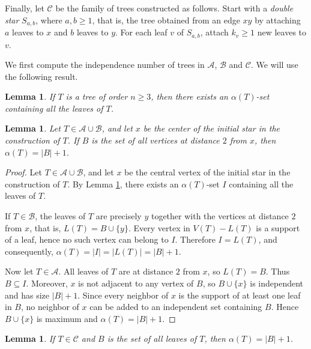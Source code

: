 \documentclass[11pt]{article}
\newtheorem{lemma}[theorem]{Lemma}
\newcommand{\al}{\alpha}
\newcommand{\db}[1]{{\color{orange}#1}}%
\begin{document}
Finally, let $\mathcal{C}$ be the family of trees constructed as follows.
Start with a \emph{double star} $S_{a,b}$, where $a,b\ge 1$, that is,
the tree obtained from an edge $xy$ by attaching $a$ leaves to $x$
and $b$ leaves to $y$.
For each leaf $v$ of $S_{a,b}$, attach $k_v\ge 1$ new leaves to $v$.

We first compute the independence number of trees in $\mathcal{A}$, $\mathcal{B}$ and $\mathcal{C}$.
We will use the following result.

\begin{lemma}
\cite{martinez}
\label{mar}
If $T$ is a tree of order $n\geq 3$, then there exists an $\al(T)$-set containing all the leaves of $T$.
\end{lemma}


\begin{lemma}
\label{alfa-A}
Let $T\in\mathcal{A}\cup \mathcal{B}$, and let $x$ be the center of the initial star in the construction of $T$. If $B$ is the set of all vertices at distance $2$ from $x$, then $\alpha(T)=|B|+1$.
\end{lemma}

\begin{proof} Let $T\in\mathcal{A}\cup \mathcal{B}$, and let $x$ be the central vertex of the initial star in the construction of $T$. By Lemma \ref{mar}, there exists an $\al(T)$-set $I$ containing all the leaves of $T$.


If $T\in\mathcal{B}$, the leaves of $T$ are precisely $y$ together with 
the vertices at distance $2$ from $x$, that is, $L(T)=B\cup\{y\}$. Every vertex in $V(T)-L(T)$ is a support of a leaf, hence no such vertex can belong to $I$. Therefore 
$I=L(T)$, and consequently,
$\al(T)=|I|=|L(T)|=|B|+1$.

Now let $T\in\mathcal{A}$.
All leaves of $T$ are at distance $2$ from $x$, so $L(T)=B$. Thus $B\subseteq I$.
Moreover, $x$ is not adjacent to any vertex of $B$, so $B\cup\{x\}$ is independent and has
size $|B|+1$. Since every neighbor of $x$ is the support of at least one leaf in $B$, no
neighbor of $x$ can be added to an independent set containing $B$. Hence $B\cup\{x\}$ is
maximum and $\al(T)=|B|+1$.

\end{proof}

\begin{lemma}
\label{alfa-B}
If $T\in\mathcal{C}$ and $B$ is the set of all leaves of $T$, then $\alpha(T)=|B|+1$.
\end{lemma}
\end{document}
